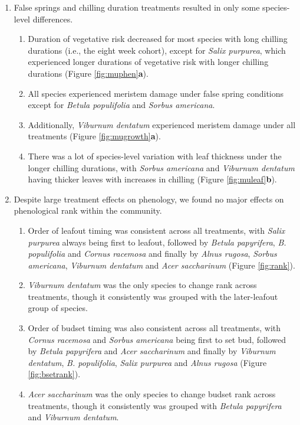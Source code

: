 \documentclass{article}\usepackage[]{graphicx}\usepackage[]{color}
\begin{document}
\begin{enumerate}
  
\item False springs and chilling duration treatments resulted in only some species-level differences.
 \begin{enumerate}
  \item Duration of vegetative risk decreased for most species with long chilling durations (i.e., the eight week cohort), except for \textit{Salix purpurea}, which experienced longer durations of vegetative risk with longer chilling durations (Figure \ref{fig:muphen}\textbf{a}). 
  \item All species experienced meristem damage under false spring conditions except for \textit{Betula populifolia} and \textit{Sorbus americana}.
  \item Additionally, \textit{Viburnum dentatum} experienced meristem damage under all treatments (Figure \ref{fig:mugrowth}\textbf{a}). 
  \item There was a lot of species-level variation with leaf thickness under the longer chilling durations, with \textit{Sorbus americana} and \textit{Viburnum dentatum} having thicker leaves with increases in chilling (Figure \ref{fig:muleaf}\textbf{b}). 
  \end{enumerate}
  
\item Despite large treatment effects on phenology, we found no major effects on phenological rank within the community.
  \begin{enumerate}
  \item Order of leafout timing was consistent across all treatments, with \textit{Salix purpurea} always being first to leafout, followed by \textit{Betula papyrifera}, \textit{B. populifolia} and \textit{Cornus racemosa} and finally by \textit{Alnus rugosa}, \textit{Sorbus americana}, \textit{Viburnum dentatum} and \textit{Acer saccharinum} (Figure \ref{fig:rank}).
  \item \textit{Viburnum dentatum} was the only species to change rank across treatments, though it consistently was grouped with the later-leafout group of species.
  \item Order of budset timing was also consistent across all treatments, with \textit{Cornus racemosa} and \textit{Sorbus americana} being first to set bud, followed by \textit{Betula papyrifera} and \textit{Acer saccharinum} and finally by \textit{Viburnum dentatum}, \textit{B. populifolia}, \textit{Salix purpurea} and \textit{Alnus rugosa} (Figure \ref{fig:bsetrank}).
  \item \textit{Acer saccharinum} was the only species to change budset rank across treatments, though it consistently was grouped with \textit{Betula papyrifera} and \textit{Viburnum dentatum}.%
  \end{enumerate}
\end{enumerate}
\end{document}
